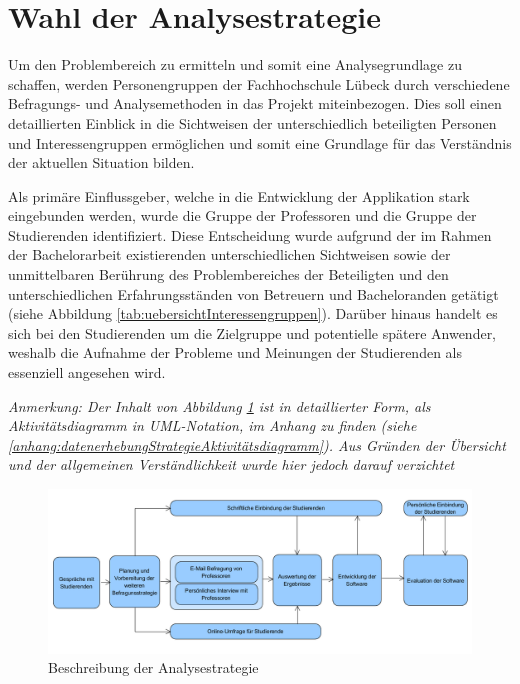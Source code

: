 \documentclass[bibliography=totoc,listof=totoc,BCOR=5mm,DIV=12,oneside]{scrbook}
\begin{document}
\newpage
\section{Wahl der Analysestrategie}
\par Um den Problembereich zu ermitteln und somit eine Analysegrundlage zu schaffen, werden Personengruppen der Fachhochschule Lübeck durch verschiedene Befragungs- und Analysemethoden in das Projekt miteinbezogen. Dies soll einen detaillierten Einblick in die Sichtweisen der unterschiedlich beteiligten Personen und Interessengruppen ermöglichen und somit eine Grundlage für das Verständnis der aktuellen Situation bilden.

\par Als primäre Einflussgeber, welche in die Entwicklung der Applikation stark eingebunden werden, wurde die Gruppe der Professoren und die Gruppe der Studierenden identifiziert. Diese Entscheidung wurde aufgrund der im Rahmen der Bachelorarbeit existierenden unterschiedlichen Sichtweisen sowie der unmittelbaren Berührung des Problembereiches der Beteiligten und den unterschiedlichen Erfahrungsständen von Betreuern und Bacheloranden getätigt (siehe Abbildung \ref{tab:uebersichtInteressengruppen}). Darüber hinaus handelt es sich bei den Studierenden um die Zielgruppe und potentielle spätere Anwender, weshalb die Aufnahme der Probleme und Meinungen der Studierenden als essenziell angesehen wird. 

\par \bigskip \textit{Anmerkung: Der Inhalt von Abbildung \ref{img:analysestrategie} ist in detaillierter Form, als Aktivitätsdiagramm in UML-Notation, im Anhang zu finden (siehe \ref{anhang:datenerhebungStrategieAktivitätsdiagramm}). Aus Gründen der Übersicht und der allgemeinen Verständlichkeit wurde hier jedoch darauf verzichtet}

\bigskip
\begin{figure}[H]
	\centering
	\includegraphics[width=1\textwidth, keepaspectratio]{Bilder/Diagramme/Analysestrategie.png}
	\caption{Beschreibung der Analysestrategie}
	\label{img:analysestrategie}
\end{figure}
\end{document}
